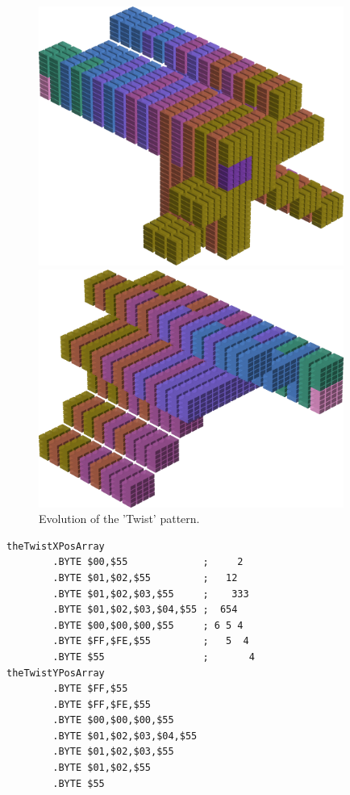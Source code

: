 \begin{figure}[H]
    \centering
    \begin{adjustbox}{width=10cm,center}
      \includegraphics[width=10cm]{src/colorspace_patterns/pattern0-45.png}%
    \end{adjustbox}
    \begin{adjustbox}{width=10cm}
      \includegraphics[width=10cm]{src/colorspace_patterns/pattern0-225.png}%
    \end{adjustbox}
\caption{Evolution of the 'Twist' pattern.}
\end{figure}
\clearpage

\begin{lstlisting}[caption=Source code for the Twist]
theTwistXPosArray                        
        .BYTE $00,$55             ;     2  
        .BYTE $01,$02,$55         ;   12   
        .BYTE $01,$02,$03,$55     ;    333 
        .BYTE $01,$02,$03,$04,$55 ;  654   
        .BYTE $00,$00,$00,$55     ; 6 5 4  
        .BYTE $FF,$FE,$55         ;   5  4 
        .BYTE $55                 ;       4
theTwistYPosArray
        .BYTE $FF,$55
        .BYTE $FF,$FE,$55
        .BYTE $00,$00,$00,$55
        .BYTE $01,$02,$03,$04,$55
        .BYTE $01,$02,$03,$55
        .BYTE $01,$02,$55
        .BYTE $55
\end{lstlisting}

